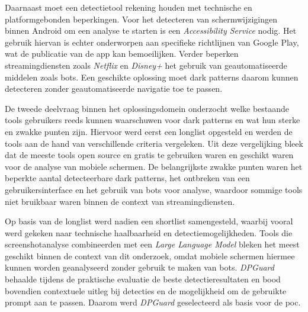 \vspace{1em}

Daarnaast moet een detectietool rekening houden met technische en platformgebonden beperkingen. Voor het detecteren van schermwijzigingen binnen Android om een analyse te starten is een \textit{Accessibility Service} nodig. Het gebruik hiervan is echter onderworpen aan specifieke richtlijnen van Google Play, wat de publicatie van de app kan bemoeilijken. Verder beperken streamingdiensten zoals \textit{Netflix} en \textit{Disney+} het gebruik van geautomatiseerde middelen zoals bots. Een geschikte oplossing moet dark patterns daarom kunnen detecteren zonder geautomatiseerde navigatie toe te passen.

\vspace{1em}

De tweede deelvraag binnen het oplossingsdomein onderzocht welke bestaande tools gebruikers reeds kunnen waarschuwen voor dark patterns en wat hun sterke en zwakke punten zijn. Hiervoor werd eerst een longlist opgesteld en werden de tools aan de hand van verschillende criteria vergeleken. Uit deze vergelijking bleek dat de meeste tools open source en gratis te gebruiken waren en geschikt waren voor de analyse van mobiele schermen. De belangrijkste zwakke punten waren het beperkte aantal detecteerbare dark patterns, het ontbreken van een gebruikersinterface en het gebruik van bots voor analyse, waardoor sommige tools niet bruikbaar waren binnen de context van streamingdiensten.

\vspace{1em}

Op basis van de longlist werd nadien een shortlist samengesteld, waarbij vooral werd gekeken naar technische haalbaarheid en detectiemogelijkheden. Tools die screenshotanalyse combineerden met een \textit{Large Language Model} bleken het meest geschikt binnen de context van dit onderzoek, omdat mobiele schermen hiermee kunnen worden geanalyseerd zonder gebruik te maken van bots. \textit{DPGuard} behaalde tijdens de praktische evaluatie de beste detectieresultaten en bood bovendien contextuele uitleg bij detecties en de mogelijkheid om de gebruikte prompt aan te passen. Daarom werd \textit{DPGuard} geselecteerd als basis voor de \acrshort{poc}.

\vspace{1em}

